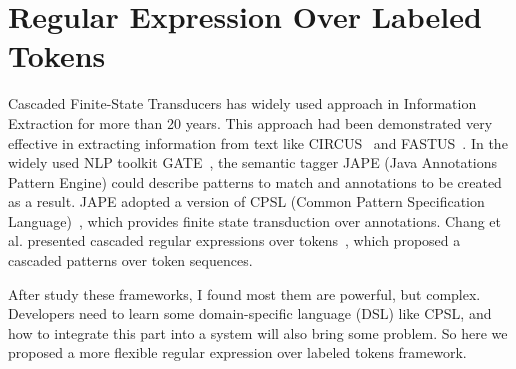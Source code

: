 \section{Regular Expression Over Labeled Tokens}

Cascaded Finite-State Transducers has widely used approach in Information Extraction for more than 20 years. This approach had been demonstrated   very effective in extracting information from text like CIRCUS~\cite{lehnert1991university} and FASTUS~\cite{hobbs199713}.  In the widely used NLP toolkit GATE~\cite{cunningham2002framework}, the semantic tagger JAPE (Java Annotations Pattern Engine) could describe patterns to match and annotations to be created as  a result. JAPE adopted a version of CPSL (Common Pattern  Specification Language)~\cite{appelt1998common}, which provides finite state transduction over annotations. Chang et al. presented cascaded regular expressions over tokens~\cite{chang2014tokensregex}, which proposed a cascaded patterns over token sequences.

After study these frameworks, I found most them are powerful, but complex. Developers need to learn some  domain-specific language (DSL) like CPSL, and how to integrate this part into a system will also bring some problem. So here we proposed a more flexible regular expression over labeled tokens framework.
